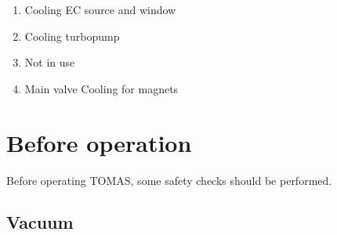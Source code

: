 \documentclass[fleqn,a4paper,20pt]{article}
\begin{document}
\begin{enumerate}
	\item Cooling EC source and window
	\item Cooling turbopump
	\item Not in use
	\item Main valve Cooling for magnets
\end{enumerate}

\newpage
\section{Before operation}%


Before operating TOMAS, some safety checks should be performed.

\subsection{Vacuum}
\end{document}
